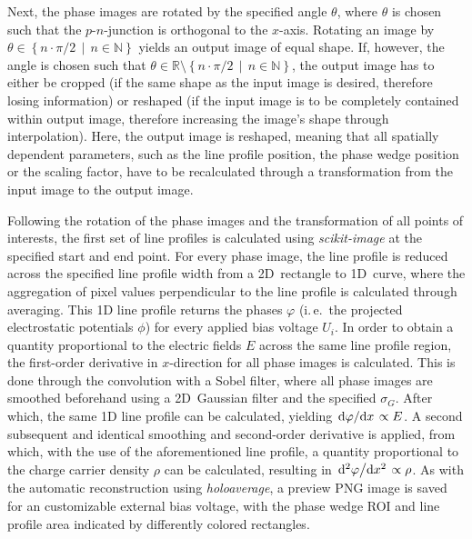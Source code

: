 Next, the phase images are rotated by the specified angle $\theta$, where $\theta$ is chosen such that the $p$-$n$-junction is orthogonal to the $x$-axis. Rotating an image by $\theta \in \left\{n \cdot \pi / 2 \, \middle| \, n \in \mathbb{N}\right\}$ yields an output image of equal shape. If, however, the angle is chosen such that $\theta \in \mathbb{R} \setminus \left\{n \cdot \pi / 2 \, \middle| \, n \in \mathbb{N}\right\}$, the output image has to either be cropped (if the same shape as the input image is desired, therefore losing information) or reshaped (if the input image is to be completely contained within output image, therefore increasing the image's shape through interpolation). Here, the output image is reshaped, meaning that all spatially dependent parameters, such as the line profile position, the phase wedge position or the scaling factor, have to be recalculated through a transformation from the input image to the output image.

Following the rotation of the phase images and the transformation of all points of interests, the first set of line profiles is calculated using \emph{scikit-image} at the specified start and end point. For every phase image, the line profile is reduced across the specified line profile width from a 2D~rectangle to 1D~curve, where the aggregation of pixel values perpendicular to the line profile is calculated through averaging. This 1D line profile returns the phases $\varphi$ (i.\,e.\ the projected electrostatic potentials $\phi$) for every applied bias voltage $U_i$. In order to obtain a quantity proportional to the electric fields $E$ across the same line profile region, the first-order derivative in $x$-direction for all phase images is calculated. This is done through the convolution with a Sobel filter, where all phase images are smoothed beforehand using a 2D~Gaussian filter and the specified $\sigma_G$. After which, the same 1D line profile can be calculated, yielding $\dv*{\varphi}{x} \propto E$. A second subsequent and identical smoothing and second-order derivative is applied, from which, with the use of the aforementioned line profile, a quantity proportional to the charge carrier density $\rho$ can be calculated, resulting in $\dv*[2]{\varphi}{x} \propto \rho$. As with the automatic reconstruction using \emph{holoaverage}, a preview PNG image is saved for an customizable external bias voltage, with the phase wedge ROI and line profile area indicated by differently colored rectangles.


